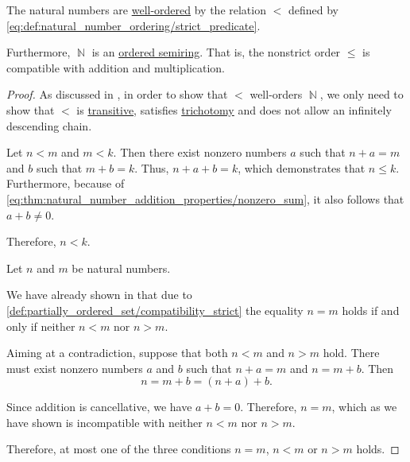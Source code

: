 \begin{proposition}\label{thm:natural_numbers_are_well_ordered}
  The natural numbers are \hyperref[def:well_ordered_set]{well-ordered} by the relation \( < \) defined by \eqref{eq:def:natural_number_ordering/strict_predicate}.

  Furthermore, \( \BbbN \) is an \hyperref[def:ordered_semiring]{ordered semiring}. That is, the nonstrict order \( \leq \) is compatible with addition and multiplication.
\end{proposition}
\begin{proof}
  As discussed in , in order to show that \( < \) well-orders \( \BbbN \), we only need to show that \( < \) is \hyperref[def:binary_relation/transitive]{transitive}, satisfies \hyperref[def:binary_relation/trichotomic]{trichotomy} and does not allow an infinitely descending chain.

   Let \( n < m \) and \( m < k \). Then there exist nonzero numbers \( a \) such that \( n + a = m \) and \( b \) such that \( m + b = k \). Thus, \( n + a + b = k \), which demonstrates that \( n \leq k \). Furthermore, because of \eqref{eq:thm:natural_number_addition_properties/nonzero_sum}, it also follows that \( a + b \neq 0 \).

  Therefore, \( n < k \).

   Let \( n \) and \( m \) be natural numbers.

  We have already shown in  that due to \eqref{def:partially_ordered_set/compatibility_strict} the equality \( n = m \) holds if and only if neither \( n < m \) nor \( n > m \).

  Aiming at a contradiction, suppose that both \( n < m \) and \( n > m \) hold. There must exist nonzero numbers \( a \) and \( b \) such that \( n + a = m \) and \( n = m + b \). Then
  \begin{equation*}
    n = m + b = (n + a) + b.
  \end{equation*}

  Since addition is cancellative, we have \( a + b = 0 \). Therefore, \( n = m \), which as we have shown is incompatible with neither \( n < m \) nor \( n > m \).

  Therefore, at most one of the three conditions \( n = m \), \( n < m \) or \( n > m \) holds.


\end{proof}
